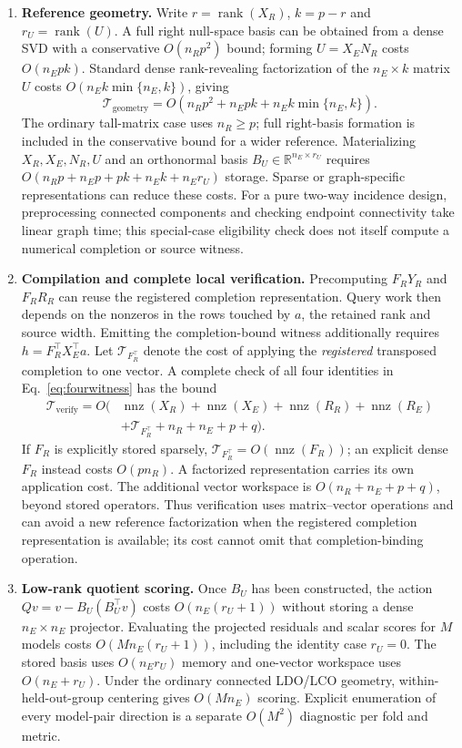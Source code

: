 \documentclass[preprint,12pt,number,sort&compress]{elsarticle}
\newcommand{\R}{\mathbb{R}}
\DeclareMathOperator{\rank}{rank}
\DeclareMathOperator{\nnz}{nnz}
\begin{document}
\begin{enumerate}
\item \textbf{Reference geometry.} Write $r=\rank(X_R)$, $k=p-r$ and $r_U=\rank(U)$. A full right null-space basis can be obtained from a dense SVD with a conservative $O(n_Rp^2)$ bound; forming $U=X_EN_R$ costs $O(n_Epk)$. Standard dense rank-revealing factorization of the $n_E\times k$ matrix $U$ costs $O(n_Ek\min\{n_E,k\})$, giving
\[
\mathcal T_{\mathrm{geometry}}
=O\!\left(n_Rp^2+n_Epk+n_Ek\min\{n_E,k\}\right).
\]
The ordinary tall-matrix case uses $n_R\ge p$; full right-basis formation is included in the conservative bound for a wider reference. Materializing $X_R,X_E,N_R,U$ and an orthonormal basis $B_U\in\R^{n_E\times r_U}$ requires $O(n_Rp+n_Ep+pk+n_Ek+n_Er_U)$ storage. Sparse or graph-specific representations can reduce these costs. For a pure two-way incidence design, preprocessing connected components and checking endpoint connectivity take linear graph time; this special-case eligibility check does not itself compute a numerical completion or source witness.
\item \textbf{Compilation and complete local verification.} Precomputing $F_RY_R$ and $F_RR_R$ can reuse the registered completion representation. Query work then depends on the nonzeros in the rows touched by $a$, the retained rank and source width. Emitting the completion-bound witness additionally requires $h=F_R^\top X_E^\top a$. Let $\mathcal T_{F_R^\top}$ denote the cost of applying the \emph{registered} transposed completion to one vector. A complete check of all four identities in Eq.~\eqref{eq:fourwitness} has the bound
\begin{equation}\label{eq:verifycost}
\begin{aligned}
\mathcal T_{\mathrm{verify}}=O\big(&\nnz(X_R)+\nnz(X_E)+\nnz(R_R)+\nnz(R_E)\\
&+\mathcal T_{F_R^\top}+n_R+n_E+p+q\big).
\end{aligned}
\end{equation}
If $F_R$ is explicitly stored sparsely, $\mathcal T_{F_R^\top}=O(\nnz(F_R))$; an explicit dense $F_R$ instead costs $O(pn_R)$. A factorized representation carries its own application cost. The additional vector workspace is $O(n_R+n_E+p+q)$, beyond stored operators. Thus verification uses matrix--vector operations and can avoid a new reference factorization when the registered completion representation is available; its cost cannot omit that completion-binding operation.
\item \textbf{Low-rank quotient scoring.} Once $B_U$ has been constructed, the action $Qv=v-B_U(B_U^\top v)$ costs $O(n_E(r_U+1))$ without storing a dense $n_E\times n_E$ projector. Evaluating the projected residuals and scalar scores for $M$ models costs $O(Mn_E(r_U+1))$, including the identity case $r_U=0$. The stored basis uses $O(n_Er_U)$ memory and one-vector workspace uses $O(n_E+r_U)$. Under the ordinary connected LDO/LCO geometry, within-held-out-group centering gives $O(Mn_E)$ scoring. Explicit enumeration of every model-pair direction is a separate $O(M^2)$ diagnostic per fold and metric.

\end{enumerate}
\end{document}
